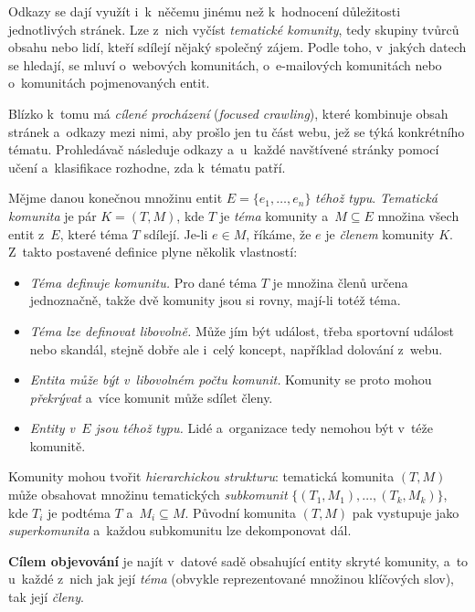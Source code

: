 \documentclass[11pt,a4paper]{article}
\theoremstyle{definition}
\begin{document}
Odkazy se dají využít i~k~něčemu jinému než k~hodnocení důležitosti jednotlivých stránek. Lze
z~nich vyčíst \emph{tematické komunity}, tedy skupiny tvůrců obsahu nebo lidí, kteří sdílejí
nějaký společný zájem. Podle toho, v~jakých datech se hledají, se mluví o~webových komunitách,
o~e-mailových komunitách nebo o~komunitách pojmenovaných entit.

Blízko k~tomu má \emph{cílené procházení} (\emph{focused crawling}), které kombinuje obsah
stránek a~odkazy mezi nimi, aby prošlo jen tu část webu, jež se týká konkrétního tématu.
Prohledávač následuje odkazy a~u~každé navštívené stránky pomocí učení a~klasifikace rozhodne,
zda k~tématu patří.

\begin{defbox}
Mějme danou konečnou množinu entit $E=\{e_1,\dots,e_n\}$ \emph{téhož typu}. \emph{Tematická
komunita} je pár $K=(T,M)$, kde $T$ je \emph{téma} komunity a~$M\subseteq E$ množina všech entit
z~$E$, které téma $T$ sdílejí. Je-li $e\in M$, říkáme, že $e$ je \emph{členem} komunity $K$.
Z~takto postavené definice plyne několik vlastností:
\begin{itemize}
\item \emph{Téma definuje komunitu.} Pro dané téma $T$ je množina členů určena jednoznačně,
      takže dvě komunity jsou si rovny, mají-li totéž téma.
\item \emph{Téma lze definovat libovolně.} Může jím být událost, třeba sportovní událost nebo
      skandál, stejně dobře ale i~celý koncept, například dolování z~webu.
\item \emph{Entita může být v~libovolném počtu komunit.} Komunity se proto mohou
      \emph{překrývat} a~více komunit může sdílet členy.
\item \emph{Entity v~$E$ jsou téhož typu.} Lidé a~organizace tedy nemohou být v~téže komunitě.
\end{itemize}
Komunity mohou tvořit \emph{hierarchickou strukturu}: tematická komunita $(T,M)$ může obsahovat
množinu tematických \emph{subkomunit} $\{(T_1,M_1),\dots,(T_k,M_k)\}$, kde $T_i$ je podtéma
$T$ a~$M_i\subseteq M$. Původní komunita $(T,M)$ pak vystupuje jako \emph{superkomunita}
a~každou subkomunitu lze dekomponovat dál.

\textbf{Cílem objevování} je najít v~datové sadě obsahující entity skryté komunity, a~to
u~každé z~nich jak její \emph{téma} (obvykle reprezentované množinou klíčových slov), tak její
\emph{členy}.
\end{defbox}
\end{document}
